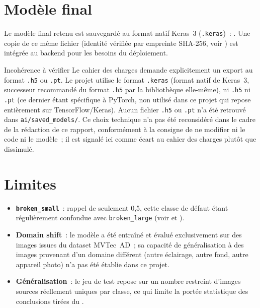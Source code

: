 \section{Mod\`ele final}

Le mod\`ele final retenu est sauvegard\'e au format natif Keras~3 (\texttt{.keras})~: . Une copie de ce m\^eme fichier (identit\'e v\'erifi\'ee par empreinte SHA-256, voir ) est int\'egr\'ee au backend pour les besoins du d\'eploiement.

\begin{noteflag}{Incoh\'erence \`a v\'erifier}
Le cahier des charges demande explicitement un export au format \texttt{.h5} ou \texttt{.pt}. Le projet utilise le format \texttt{.keras} (format natif de Keras~3, successeur recommand\'e du format \texttt{.h5} par la biblioth\`eque elle-m\^eme), ni \texttt{.h5} ni \texttt{.pt} (ce dernier \'etant sp\'ecifique \`a PyTorch, non utilis\'e dans ce projet qui repose enti\`erement sur TensorFlow/Keras). Aucun fichier \texttt{.h5} ou \texttt{.pt} n'a \'et\'e retrouv\'e dans \texttt{ai/saved\_models/}. Ce choix technique n'a pas \'et\'e reconsid\'er\'e dans le cadre de la r\'edaction de ce rapport, conform\'ement \`a la consigne de ne modifier ni le code ni le mod\`ele~; il est signal\'e ici comme \'ecart au cahier des charges plut\^ot que dissimul\'e.
\end{noteflag}

\section{Limites}

\begin{itemize}
  \item \textbf{\texttt{broken\_small}}~: rappel de seulement 0,5, cette classe de d\'efaut \'etant r\'eguli\`erement confondue avec \texttt{broken\_large} (voir  et ).
  \item \textbf{Domain shift}~: le mod\`ele a \'et\'e entra\^in\'e et \'evalu\'e exclusivement sur des images issues du dataset MVTec~AD~; sa capacit\'e de g\'en\'eralisation \`a des images provenant d'un domaine diff\'erent (autre \'eclairage, autre fond, autre appareil photo) n'a pas \'et\'e \'etablie dans ce projet.
  \item \textbf{G\'en\'eralisation}~: le jeu de test repose sur un nombre restreint d'images sources r\'eellement uniques par classe, ce qui limite la port\'ee statistique des conclusions tir\'ees du .
\end{itemize}
